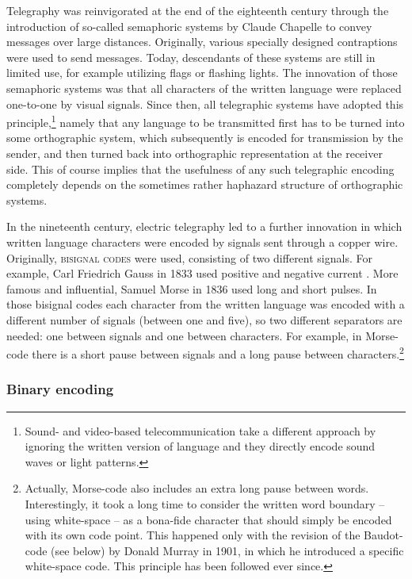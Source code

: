 Telegraphy was reinvigorated at the end of the eighteenth century through the
introduction of so-called semaphoric systems by Claude Chapelle to convey
messages over large distances. Originally, various specially designed
contraptions were used to send messages. Today, descendants of these systems are
still in limited use, for example utilizing flags or flashing lights. The
innovation of those semaphoric systems was that all characters of the
written language were replaced one-to-one by visual signals. Since then, all
telegraphic systems have adopted this principle,\footnote{Sound- and
video-based telecommunication take a different approach by ignoring
the written version of language and they directly encode sound waves or light
patterns.} namely that any language to be
transmitted first has to be turned into some orthographic system, which
subsequently is encoded for transmission by the sender, and then turned back
into orthographic representation at the receiver side. This of course implies 
that the usefulness of any such telegraphic
encoding completely depends on the sometimes rather haphazard structure of
orthographic systems.

In the nineteenth century, electric telegraphy led to a further innovation in
which written language characters were encoded by signals sent through a copper
wire. Originally, \textsc{bisignal codes} were used, consisting of two different
signals. For example, Carl Friedrich Gauss in 1833 used positive and negative
current \citep[282]{Mania2008}. More famous and influential, Samuel Morse in
1836 used long and short pulses. In those bisignal codes each character from the
written language was encoded with a different number of signals (between one and
five), so two different separators are needed: one between signals and one
between characters. For example, in Morse-code there is a short pause between
signals and a long pause between characters.\footnote{Actually, Morse-code also
includes an extra long pause between words. Interestingly, it took a long time
to consider the written word boundary -- using white-space -- as a bona-fide
character that should simply be encoded with its own code point. This happened
only with the revision of the Baudot-code (see below) by Donald Murray in 1901,
in which he introduced a specific white-space code. This principle has been
followed ever since.}

\subsubsection*{Binary encoding}

